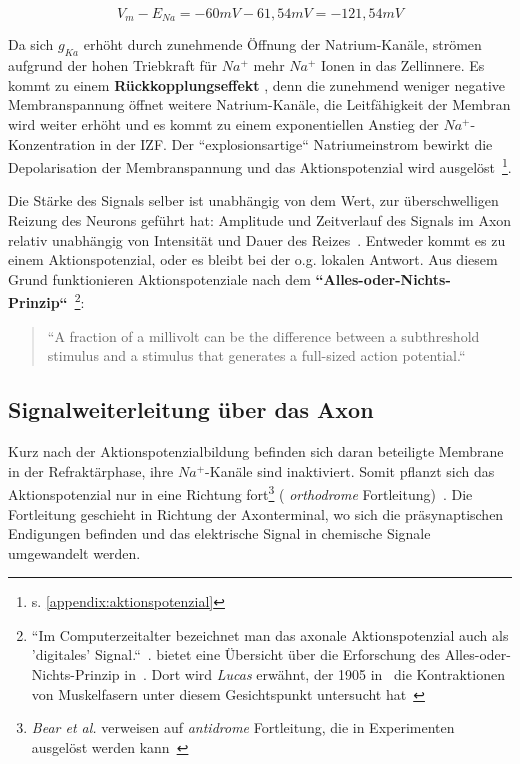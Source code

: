{{{ \begin{equation}
  V_m - E_{Na} = -60 mV - 61,54 mV = -121,54 mV
  \label{eq:gl-triebkraft}
 \end{equation}


Da sich $g_{Ka}$ erhöht durch zunehmende Öffnung der Natrium-Kanäle, strömen aufgrund der hohen Triebkraft für $Na^+$ mehr $Na^+$ Ionen in das Zellinnere. Es kommt zu einem \textbf{Rückkopplungseffekt} , denn die zunehmend weniger negative Membranspannung öffnet weitere Natrium-Kanäle, die Leitfähigkeit der Membran wird weiter erhöht und es kommt zu einem exponentiellen Anstieg der $Na^+$-Konzentration in der IZF. Der ``explosionsartige`` Natriumeinstrom bewirkt die Depolarisation der Membranspannung und das Aktionspotenzial wird ausgelöst~\cite[69]{FE19}\footnote{
s. \ref{appendix:aktionspotenzial}
}.

Die Stärke des Signals selber ist unabhängig von dem Wert, zur überschwelligen Reizung des Neurons geführt hat: Amplitude und Zeitverlauf des Signals im Axon relativ unabhängig von Intensität und Dauer des Reizes~\cite[75]{Jon19}. Entweder kommt es zu einem Aktionspotenzial, oder es bleibt bei der o.g. lokalen Antwort. Aus diesem Grund funktionieren Aktionspotenziale nach dem \textbf{``Alles-oder-Nichts-Prinzip``}~\cite[89]{BCP18}\footnote{
 ``Im Computerzeitalter bezeichnet man das axonale Aktionspotenzial auch als 'digitales' Signal.``~\cite[75]{Jon19}.  bietet eine Übersicht über die Erforschung des Alles-oder-Nichts-Prinzip in~\cite{Fra94}. Dort wird \textit{Lucas} erwähnt, der 1905 in~\cite{Luc05} die Kontraktionen von Muskelfasern unter diesem Gesichtspunkt untersucht hat~\cite[210]{Fra94}
}:

\blockquote[{\cite[157]{KSJ+13}}]{
 ``A fraction of a millivolt can be the difference between a subthreshold stimulus and a stimulus that generates a full-sized action potential.``
}

\subsection{Signalweiterleitung über das Axon}

Kurz nach der Aktionspotenzialbildung befinden sich daran beteiligte Membrane in der Refraktärphase, ihre $Na^+$-Kanäle sind inaktiviert. 
Somit pflanzt sich das Aktionspotenzial nur in eine Richtung fort\footnote{
  \textit{Bear et al.} verweisen auf \textit{antidrome} Fortleitung, die in Experimenten ausgelöst werden kann~\cite[106]{BCP18}
} ( \textit{orthodrome} Fortleitung)~\cite[106]{BCP18}.
Die Fortleitung geschieht in Richtung der Axonterminal, wo sich die präsynaptischen Endigungen befinden und das elektrische Signal in chemische Signale umgewandelt werden.

}}}
